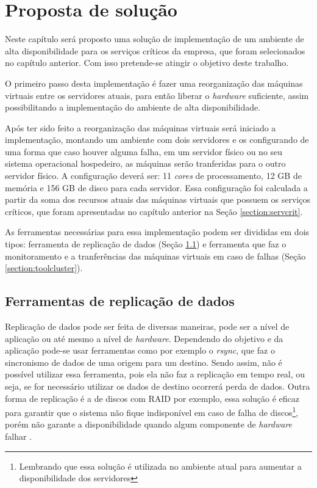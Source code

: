 \chapter{Proposta de solução}
\label{cap:propostadesolucao}

Neste capítulo será proposto uma solução de implementação de um ambiente de alta disponibilidade para os serviços críticos da empresa, que 
foram selecionados no capítulo anterior. Com isso pretende-se atingir o objetivo deste trabalho.

O primeiro passo desta implementação é fazer uma reorganização das máquinas virtuais entre os servidores atuais, para então liberar o 
\textit{hardware} suficiente, assim possibilitando a implementação do ambiente de alta disponibilidade. 

Após ter sido feito a reorganização das máquinas virtuais será iniciado a implementação, montando um ambiente com dois servidores e os 
configurando de uma forma que caso houver alguma falha, em um servidor físico ou no seu sistema operacional hospedeiro, as máquinas serão 
tranferidas para o outro servidor físico. 
A configuração deverá ser: 11 \textit{cores} de processamento, 12 GB de memória e 156 GB de disco para cada servidor. Essa configuração foi 
calculada a partir da soma dos recursos atuais das máquinas virtuais que possuem os serviços críticos, que foram apresentadas no capítulo
anterior na Seção \ref{section:servcrit}.

As ferramentas necessárias para essa implementação podem ser divididas em dois tipos: ferramenta de replicação de dados 
(Seção \ref{section:toolrepl}) e ferramenta que faz o monitoramento e a tranferências das máquinas virtuais em caso de falhas 
(Seção \ref{section:toolcluster}).

\section{Ferramentas de replicação de dados}
\label{section:toolrepl}

Replicação de dados pode ser feita de diversas maneiras, pode ser a nível de aplicação ou até mesmo a nível de \textit{hardware}.
Dependendo do objetivo e da aplicação pode-se usar ferramentas como por exemplo o \textit{rsync}, que faz o sincronismo de dados de uma origem
para um destino. Sendo assim, não é possível utilizar essa ferramenta, pois ela não faz a replicação em tempo real, ou seja, se for necessário
utilizar os dados de destino ocorrerá perda de dados. Outra forma de replicação é a de discos com \ac{RAID} por exemplo, essa solução é eficaz
para garantir que o sistema não fique indisponível em caso de falha de discos\footnote{Lembrando que essa solução é utilizada no ambiente atual
para aumentar a disponibilidade dos servidores}, porém não garante a disponibilidade quando algum componente de \textit{hardware} falhar 
\cite{zaminhani2008}.


